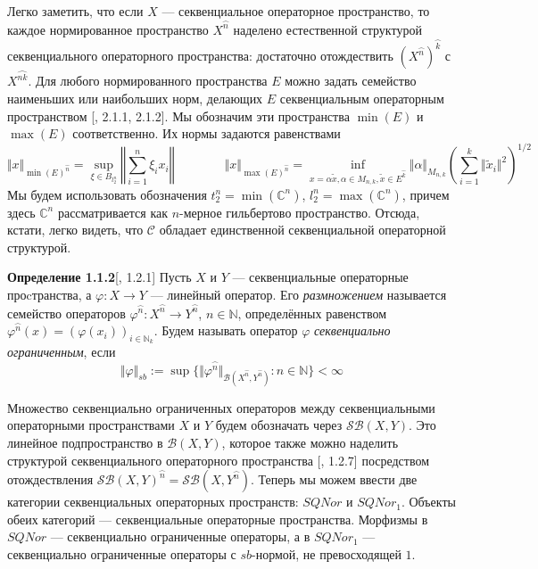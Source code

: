 \documentclass[12pt]{article}
\begin{document}
Легко заметить, что если $X$ --- секвенциальное операторное пространство, то
каждое нормированное пространство $X^{\wideparen{n}}$ наделено естественной
структурой секвенциального операторного пространства: достаточно отождествить
${(X^{\wideparen{n}})}^{\wideparen{k}}$ с $X^{\wideparen{nk}}$. Для любого
нормированного пространства $E$ можно задать семейство наименьших или наибольших
норм, делающих $E$ секвенциальным операторным пространством [\cite{LamOpFolgen},
2.1.1, 2.1.2]. Мы обозначим эти пространства $\min(E)$ и $\max(E)$
соответственно. Их нормы задаются равенствами
$$
\Vert x\Vert_{{\min(E)}^{\wideparen{n}}}
=\sup_{\xi\in B_{l_2^n}}\left\Vert\sum\limits_{i=1}^n \xi_i x_i\right\Vert
\qquad\qquad
\Vert x\Vert_{{\max(E)}^{\wideparen{n}}}
=\inf_{x=\alpha\tilde x, \alpha\in M_{n,k}, \tilde{x}\in E^{\wideparen{k}}}
    \Vert\alpha\Vert_{M_{n,k}}{\left(
        \sum\limits_{i=1}^k\Vert\tilde  x_i\Vert^2
    \right)}^{1/2}
$$
Мы будем использовать обозначения $t_2^n=\min(\mathbb{C}^n)$,
$l_2^n=\max(\mathbb{C}^n)$, причем здесь $\mathbb{C}^n$ рассматривается как
$n$-мерное гильбертово пространство. Отсюда, кстати, легко видеть, что
$\mathcal{C}$ обладает единственной секвенциальной операторной структурой.

\medskip

{\bf Определение 1.1.2}[\cite{LamOpFolgen}, 1.2.1]\label{DefSBOp} Пусть $X$ и
$Y$ --- секвенциальные операторные проcтранства, а $\varphi : X \to Y$ ---
линейный оператор. Его \textit{размножением} называется семейство операторов
$\varphi^{\wideparen{n}} : X^{\wideparen{n}} \to Y^{\wideparen{n}}$,
$n\in\mathbb{N}$, определённых равенством
$\varphi^{\wideparen{n}}(x)={(\varphi(x_i))}_{i\in\mathbb{N}_k}$. Будем называть
оператор $\varphi$ \textit{секвенциально ограниченным}, если 
$$
\Vert \varphi \Vert_{sb} 
:=\sup \{
\Vert 
    \varphi^{\wideparen{n}}
\Vert_{\mathcal{B}(X^{\wideparen{n}},Y^{\wideparen{n}})}
:n\in\mathbb{N} \}  < \infty
$$

\medskip

Множество секвенциально ограниченных операторов между секвенциальными
операторными пространствами $X$ и $Y$ будем обозначать через
$\mathcal{SB}(X,Y)$. Это линейное подпространство в $\mathcal{B}(X,Y)$, которое
также можно наделить структурой секвенциального операторного пространства
[\cite{LamOpFolgen}, 1.2.7] посредством отождествления
${\mathcal{SB}(X,Y)}^{\wideparen{n}}=\mathcal{SB}(X, Y^{\wideparen{n}})$. Теперь
мы можем ввести две категории секвенциальных операторных пространств: $SQNor$ и
$SQNor_1$. Объекты обеих категорий --- секвенциальные операторные пространства.
Морфизмы в $SQNor$ --- секвенциально ограниченные операторы, а в $SQNor_1$ ---
секвенциально ограниченные операторы с $sb$-нормой, не превосходящей $1$. 
\end{document}
